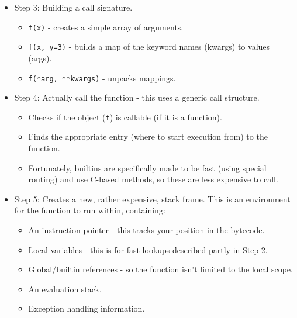 \documentclass[10pt]{article}
\begin{document}
\begin{flushleft}
\begin{itemize}
\begin{itemize}
            \item This could mean more name lookups (like above in Step 1), attribute lookups, or indexing.
            \item The resulting argument values are then pushed onto the value stack.
            \item This is an expensive part of the execution (evaluation and pushing to the stack).
        \end{itemize}
        \item Step 3: Building a call signature.
        \begin{itemize}
            \item \verb|f(x)| - creates a simple array of arguments.
            \item \verb|f(x, y=3)| - builds a map of the keyword names (kwargs) to values (args).
            \item \verb|f(*arg, **kwargs)| - unpacks mappings.
        \end{itemize}
        \item Step 4: Actually call the function - this uses a generic call structure.
        \begin{itemize}
            \item Checks if the object (\verb|f|) is callable (if it is a function).
            \item Finds the appropriate entry (where to start execution from) to the function.
            \item Fortunately, builtins are specifically made to be fast (using special routing) and use C-based methods, so these are less expensive to call.
        \end{itemize}
        \item Step 5: Creates a new, rather expensive, stack frame. This is an environment for the function to run within, containing:
        \begin{itemize}
            \item An instruction pointer - this tracks your position in the bytecode.
            \item Local variables - this is for fast lookups described partly in Step 2.
            \item Global/builtin references - so the function isn't limited to the local scope.
            \item An evaluation stack.
            \item Exception handling information.
        \end{itemize}

\end{itemize}
\end{flushleft}
\end{document}
